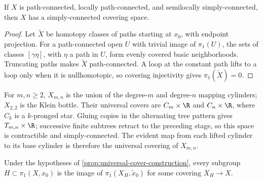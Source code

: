\begin{proposition}
\label{prop:universal-cover-construction}



If $X$ is path-connected, locally path-connected, and semilocally
simply-connected, then $X$ has a simply-connected covering space.
\end{proposition}

\begin{proof}
\sketch Let $\widetilde X$ be homotopy classes of paths starting at $x_0$,
with endpoint projection. For a path-connected open $U$ with trivial image of
$\pi_1(U)$, the sets of classes $[\gamma\eta]$, with $\eta$ a path in $U$,
form evenly covered basic neighborhoods. Truncating paths makes
$\widetilde X$ path-connected. A loop at the constant path lifts to a loop
only when it is nullhomotopic, so covering injectivity gives
$\pi_1(\widetilde X)=0$.
\end{proof}

\begin{example}
\label{ex:xmn-universal-cover-construction}

For $m,n\geq2$, $X_{m,n}$ is the union of the degree-$m$ and degree-$n$
mapping cylinders; $X_{2,2}$ is the Klein bottle. Their universal covers are
$C_m\times\R$ and $C_n\times\R$, where $C_k$ is a $k$-pronged star. Gluing
copies in the alternating tree pattern gives $T_{m,n}\times\R$; successive
finite subtrees retract to the preceding stage, so this space is contractible
and simply-connected. The evident map from each lifted cylinder to its base
cylinder is therefore the universal covering of $X_{m,n}$.
\end{example}

\begin{proposition}
\label{prop:covering-space-existence-for-subgroup}



Under the hypotheses of \cref{prop:universal-cover-construction}, every
subgroup $H\subset\pi_1(X,x_0)$ is the image of $\pi_1(X_H,\widetilde x_0)$
for some covering $X_H\to X$.
\end{proposition}

